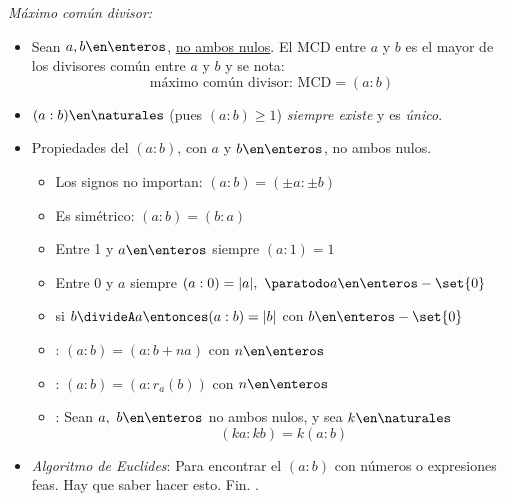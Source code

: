 \def\mcd{(a:b)}
\def\D{\mathcal D}
\def\cz{s\cdot a + t \cdot b}

\textit{Máximo común divisor: }

\begin{itemize}[label=\tiny{}]
  \item Sean $a,b \en \enteros$, \underline{no ambos nulos}. El MCD entre $a$ y $b$ es el mayor de los divisores
        común entre $a$ y $b$ y se nota:
        $$
          \boxed{
            \text{máximo común divisor: MCD}= \mcd
          }
        $$

  \item $\mcd \en \naturales$ (pues $\mcd \geq 1$) \textit{siempre existe} y es \textit{único}.

  \item Propiedades del $(a:b)$, con $a$ y $b \en \enteros$, no ambos nulos.\par
        \begin{itemize}[label={\tiny{}}]
          \item Los signos no importan: $\mcd = (\pm a : \pm b)$
          \item Es simétrico: $\mcd = (b:a)$
          \item Entre 1 y $a \en \enteros$ siempre $(a:1) = 1$
          \item Entre 0 y $a$ siempre $(a:0) = |a|,\ \paratodo a \en \enteros -\set{0}$
          \item si $b \divideA a \entonces \mcd = |b|$ con $b \en \enteros - \set{0}$
          \item {}: $\mcd = (a: b+na)$ con $n \en \enteros$
          \item {}: $\mcd = (a: r_a(b))$ con $n \en \enteros$
          \item {}: Sean $a,\ b \en \enteros$ no ambos nulos, y sea $k \en \naturales$
                $$
                  (ka:kb) = k(a:b)
                $$
        \end{itemize}

  \item \textit{Algoritmo de Euclides}:
        Para encontrar el $(a:b)$ con números o expresiones feas. Hay que saber hacer esto. Fin.
        .\par


\end{itemize}

